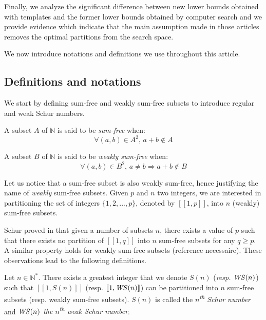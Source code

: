 \par
Finally, we analyze the significant difference between new lower bounds obtained with templates and the former 
lower bounds obtained by computer search and we provide evidence which indicate that the main assumption 
made in those articles removes the optimal partitions from the search space.

\par
We now introduce notations and definitions we use throughout this article.

\subsection{Definitions and notations}

We start by defining sum-free and weakly sum-free subsets to introduce regular and weak Schur numbers.

\begin{definition}
A subset \(A\) of \(\mathbb{N}\) is said to be \textit{sum-free} when:
\[ \forall (a,b) \in A^2 \text{, } a+b \notin A\]
\end{definition}

\begin{definition}
A subset \(B\) of \(\mathbb{N}\) is said to be \textit{weakly sum-free} when:
\[ \forall (a,b) \in B^2 \text{, } a \neq b \Longrightarrow a+b \notin B\]
\end{definition}

Let us notice that a sum-free subset is also weakly sum-free, hence justifying the name of \textit{weakly} sum-free
subsets. Given \(p\) and \(n\) two integers, we are interested in partitioning the set of integers \(\{1, 2, ..., p\}\), 
denoted by \([\![1,p]\!]\), into \(n\) (weakly) sum-free subsets.

\par
Schur proved in \cite{Schur1917} that given a number of subsets \(n\), there exists a value of \(p\)
such that there exists no partition of \([\![1,q]\!]\) into \(n\) sum-free subsets for any \(q \geqslant p\). A similar
property holds for weakly sum-free subsets (reference necessaire). These observations lead to the following definitions.

\begin{definition}
Let \(n \in \mathbb{N}^*\). There exists a greatest integer that we denote \(S(n)\) (\textit{resp. \(\mathit{WS} (n)\)}) such that
\([\![1,S(n)]\!]\) (resp. \([\![1, \mathit{WS} (n)]\!]\)) can be partitioned into \(n\) sum-free subsets (resp. weakly sum-free
subsets). \(S(n)\) is called the \textit{\(n\)\textsuperscript{th} Schur number} and \textit{\(\mathit{WS} (n)\) the
\(n\)\textsuperscript{th} weak
Schur number}.
\end{definition}

